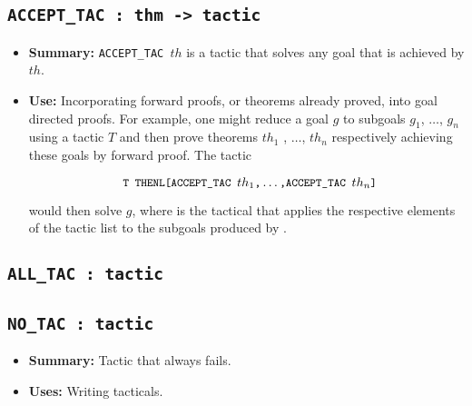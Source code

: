 \subsection{\tt ACCEPT\_TAC : thm -> tactic}\label{ACCEPTTAC}


\begin{itemize}

\item{\bf Summary:} {\small\verb|ACCEPT_TAC |}$th$
is a tactic that solves any goal that is
achieved by $th$.

\item{\bf Use:} Incorporating forward proofs, or theorems already
  proved, into goal directed proofs.  For example, one might reduce a
  goal $g$ to subgoals $g_1$, $\dots$, $g_n$ using a tactic $T$ and
  then prove theorems $th_1$ , $\dots$, $th_n$ respectively achieving
  these goals by forward proof. The tactic

\[\ml{  T THENL[ACCEPT\_TAC }th_1\ml{,}\ldots\ml{,ACCEPT\_TAC }th_n\ml{]}
\]

would then solve $g$, where 
is the tactical that applies the respective elements of the tactic
list to the subgoals produced by .

\end{itemize}



\subsection{\tt ALL\_TAC : tactic}


\subsection{\tt NO\_TAC : tactic}

\begin{itemize}
\item{\bf Summary:} Tactic that always fails.

\item{\bf Uses:} Writing tacticals.
\end{itemize}









